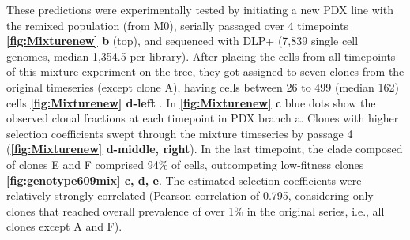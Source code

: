 
 These predictions were experimentally tested by initiating a new PDX line with the remixed population (from M0), serially passaged over 4 timepoints \textbf{\autoref{fig:Mixturenew} b} (top), and sequenced with DLP+ (7,839 single cell genomes, median 1,354.5 per library). After placing the cells from all timepoints of this mixture experiment on the tree, they got assigned to seven clones from the original timeseries (except clone A), having cells between 26 to 499 (median 162) cells \textbf{\autoref{fig:Mixturenew} d-left} . In \textbf{\autoref{fig:Mixturenew} c} blue dots show the observed clonal fractions at each timepoint in PDX branch a. Clones with higher selection coefficients swept through the mixture timeseries by passage 4 (\textbf{\autoref{fig:Mixturenew} d-middle, right}). 
 In the last timepoint, the clade composed of clones E and F comprised 94\% of cells, outcompeting low-fitness clones \textbf{\autoref{fig:genotype609mix} c, d, e}. 
The estimated selection coefficients were relatively strongly correlated (Pearson correlation of 0.795, considering only clones that reached overall prevalence of
over 1\% in the original series, i.e., all clones except A and F). 
 
 
 


